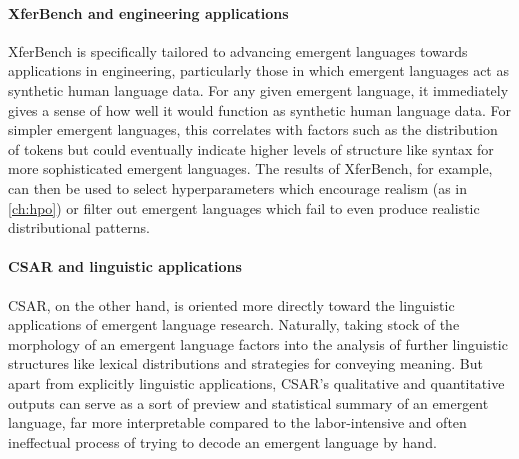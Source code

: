 \paragraph{XferBench and engineering applications}
XferBench is specifically tailored to advancing emergent languages towards applications in engineering, particularly those in which emergent languages act as synthetic human language data.
For any given emergent language, it immediately gives a sense of how well it would function as synthetic human language data.
For simpler emergent languages, this correlates with factors such as the distribution of tokens but could eventually indicate higher levels of structure like syntax for more sophisticated emergent languages.
The results of XferBench, for example, can then be used to select hyperparameters which encourage realism (as in \cref{ch:hpo}) or filter out emergent languages which fail to even produce realistic distributional patterns.



\paragraph{CSAR and linguistic applications}
CSAR, on the other hand, is oriented more directly toward the linguistic applications of emergent language research.
Naturally, taking stock of the morphology of an emergent language factors into the analysis of further linguistic structures like lexical distributions and strategies for conveying meaning.
But apart from explicitly linguistic applications,
  CSAR's qualitative and quantitative outputs can serve as a sort of preview and statistical summary of an emergent language, far more interpretable compared to the labor-intensive and often ineffectual process of trying to decode an emergent language by hand.



